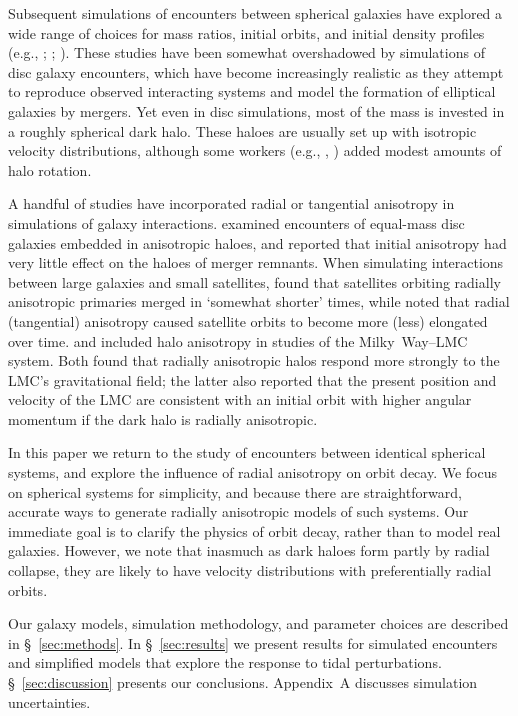 \documentclass[fleqn,usenatbib]{mnras}
\begin{document}
Subsequent simulations of encounters between spherical galaxies have explored a wide range of choices for mass ratios, initial orbits, and initial density profiles (e.g., \citealt{V1982,V1983,VM1995,MH1997,FB2001}; \citealt{BKMQ2008}; \citealt{Drakos2019}). These studies have been somewhat overshadowed by simulations of disc galaxy encounters, which have become increasingly realistic as they attempt to reproduce observed interacting systems and model the formation of elliptical galaxies by mergers. Yet even in disc simulations, most of the mass is invested in a roughly spherical dark halo. These haloes are usually set up with isotropic velocity distributions, although some workers (e.g., \citealt{Cox2006}, \citealt{SW1999}) added modest amounts of halo rotation. 

A handful of studies have incorporated radial or tangential anisotropy in simulations of galaxy interactions. \cite{McMillan2007} examined encounters of equal-mass disc galaxies embedded in anisotropic haloes, and reported that initial anisotropy had very little effect on the haloes of merger remnants. When simulating interactions between large galaxies and small satellites, \cite{AB2007} found that satellites orbiting radially aniso\-tropic primaries merged in `somewhat shorter' times, while \cite{Vasiliev2022} noted that radial (tangential) anisotropy caused satellite orbits to become more (less) elongated over time. \cite{Rozier2022} and \cite{Vasiliev2024} included halo anisotropy in studies of the Milky~Way--LMC system. Both found that radially anisotropic halos respond more strongly to the LMC's gravitational field; the latter also reported that the present position and velocity of the LMC are consistent with an initial orbit with higher angular momentum if the dark halo is radially anisotropic.

In this paper we return to the study of encounters between identical spherical systems, and explore the influence of radial anisotropy on orbit decay. We focus on spherical systems for simplicity, and because there are straightforward, accurate ways to generate radially anisotropic models of such systems. Our immediate goal is to clarify the physics of orbit decay, rather than to model real galaxies. However, we note that inasmuch as dark haloes form partly by radial collapse, they are likely to have velocity distributions with preferentially radial orbits.

Our galaxy models, simulation methodology, and parameter choices are described in \S~\ref{sec:methods}. In \S~\ref{sec:results} we present results for simulated encounters and simplified models that explore the response to tidal perturbations. \S~\ref{sec:discussion} presents our conclusions. Appendix~A discusses simulation uncertainties.
\end{document}
